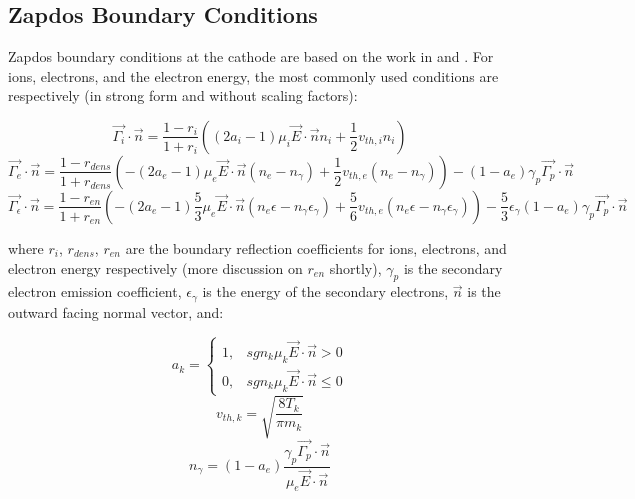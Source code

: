 \subsection{Zapdos Boundary Conditions}
\label{sec:zap_bcs}

Zapdos boundary conditions at the cathode are based on the work in \cite{hagelaar2000boundary} and \cite{sakiyama2007nonthermal}. For ions, electrons, and the electron energy, the most commonly used conditions are respectively (in strong form and without scaling factors):

\begin{equation}
  \vec{\Gamma_i}\cdot\vec{n} = \frac{1-r_i}{1+r_i}\left(\left(2a_i-1\right)\mu_i\vec{E}\cdot\vec{n}n_i + \frac{1}{2}v_{th,i}n_i\right)
  \label{eq:ion_bc_3}
\end{equation}
\begin{equation}
    \vec{\Gamma_e}\cdot\vec{n} = \frac{1-r_{dens}}{1+r_{dens}}\left(-\left(2a_e-1\right)\mu_e\vec{E}\cdot\vec{n}\left(n_e-n_{\gamma}\right) + \frac{1}{2}v_{th,e}\left(n_e-n_{\gamma}\right)\right) - \left(1-a_e\right)\gamma_p\vec{\Gamma_p}\cdot\vec{n}
  \label{eq:electron_bc_3}
\end{equation}
\begin{equation}
    \vec{\Gamma_{\epsilon}}\cdot\vec{n} = \frac{1-r_{en}}{1+r_{en}}\left(-\left(2a_e-1\right)\frac{5}{3}\mu_e\vec{E}\cdot\vec{n}\left(n_e\epsilon-n_{\gamma}\epsilon_{\gamma}\right) + \frac{5}{6}v_{th,e}\left(n_e\epsilon-n_{\gamma}\epsilon_{\gamma}\right)\right) - \frac{5}{3}\epsilon_{\gamma}\left(1-a_e\right)\gamma_p\vec{\Gamma_p}\cdot\vec{n}
  \label{eq:energy_bc_3}
\end{equation}

where $r_i$, $r_{dens}$, $r_{en}$ are the boundary reflection coefficients for ions, electrons, and electron energy respectively (more discussion on $r_{en}$ shortly), $\gamma_p$ is the secondary electron emission coefficient, $\epsilon_{\gamma}$ is the energy of the secondary electrons, $\vec{n}$ is the outward facing normal vector, and:

\begin{equation}
  a_k =
    \begin{cases}
      1, & sgn_k\mu_k\vec{E}\cdot\vec{n}>0 \\
      0, & sgn_k\mu_k\vec{E}\cdot\vec{n}\leq0
    \end{cases}
  \label{eq:a_3}
\end{equation}
\begin{equation}
  v_{th,k} = \sqrt{\frac{8T_k}{\pi m_k}}
  \label{eq:v_th_3}
\end{equation}
\begin{equation}
  n_{\gamma} = \left(1-a_e\right)\frac{\gamma_p\vec{\Gamma_p}\cdot\vec{n}}{\mu_e\vec{E}\cdot\vec{n}}
  \label{eq:n_gamma_3}
\end{equation}

